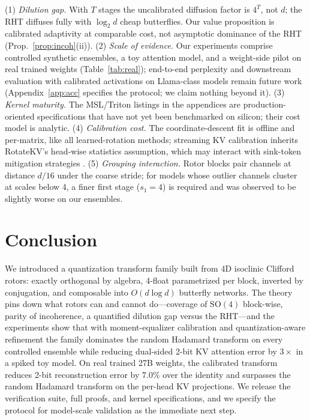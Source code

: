 \documentclass{article}
\newcommand{\SO}{\mathrm{SO}}
\begin{document}
(1) \emph{Dilution gap.} With $T$ stages the uncalibrated diffusion factor is
$4^{T}$, not $d$; the RHT diffuses fully with $\log_2 d$ cheap butterflies. Our
value proposition is calibrated adaptivity at comparable cost, not asymptotic
dominance of the RHT (Prop.~\ref{prop:incoh}(ii)). (2) \emph{Scale of evidence.} Our experiments comprise controlled synthetic
ensembles, a toy attention model, and a weight-side pilot on real trained
weights (Table~\ref{tab:real}); end-to-end perplexity and downstream
evaluation with calibrated activations on Llama-class models remain future
work (Appendix~\ref{app:acc} specifies the protocol; we claim nothing beyond
it).
(3) \emph{Kernel maturity.} The MSL/Triton listings in the appendices are
production-oriented specifications that have not yet been benchmarked on
silicon; their cost model is analytic. (4) \emph{Calibration cost.} The
coordinate-descent fit is offline and per-matrix, like all learned-rotation
methods; streaming KV calibration inherits RotateKV's head-wise statistics
assumption, which may interact with sink-token mitigation strategies
\citep{su2025rotatekv,sun2024massive}. (5) \emph{Grouping interaction.} Rotor
blocks pair channels at distance $d/16$ under the coarse stride; for models
whose outlier channels cluster at scales below 4, a finer first stage
($s_1=4$) is required and was observed to be slightly worse on our ensembles.

\section{Conclusion}

We introduced a quantization transform family built from 4D isoclinic Clifford
rotors: exactly orthogonal by algebra, 4-float parametrized per block,
inverted by conjugation, and composable into $O(d\log d)$ butterfly networks.
The theory pins down what rotors can and cannot do---coverage of $\SO(4)$
block-wise, parity of incoherence, a quantified dilution gap versus the
RHT---and the experiments show that with moment-equalizer calibration and
quantization-aware refinement the family dominates the random Hadamard
transform on every controlled ensemble while reducing dual-sided 2-bit KV
attention error by $3\times$ in a spiked toy model. On real trained 27B
weights, the calibrated transform reduces 2-bit reconstruction error by
$7.0\%$ over the identity and surpasses the random Hadamard transform on the
per-head KV projections. We release the
verification suite, full proofs, and kernel specifications, and we specify the
protocol for model-scale validation as the immediate next step.
\end{document}
